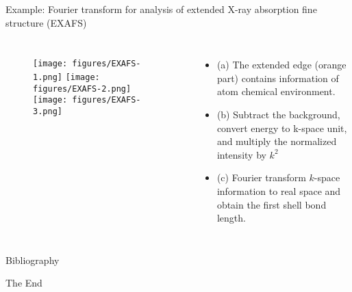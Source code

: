 \documentclass[aspectratio=169]{beamer}
\begin{document}
\begin{frame}{Example: Fourier transform for analysis of extended X-ray absorption fine structure (EXAFS)}
    
    \begin{columns}
    \begin{figure}
        \centering
    \texttt{[image: figures/EXAFS-1.png]}
    \texttt{[image: figures/EXAFS-2.png]}
    \texttt{[image: figures/EXAFS-3.png]}
    \end{figure}
    \begin{itemize}
        \item (a) The extended edge (orange part) contains information of atom chemical environment.
        \item (b) Subtract the background, convert energy to k-space unit, and multiply the normalized intensity by $k^2$
        \item (c) Fourier transform $k$-space information to real space and obtain the first shell bond length. 
    \end{itemize}
    \end{columns}
\end{frame} 


\begin{frame}[allowframebreaks]{Bibliography}
    
    
\end{frame}


\begin{frame}
    \Huge{\centerline{The End}}
\end{frame}
\end{document}
